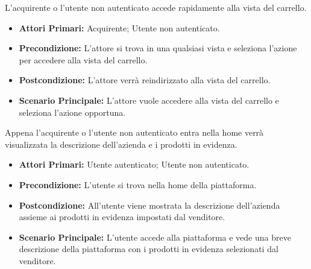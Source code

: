 L'acquirente o l'utente non autenticato accede rapidamente alla vista del carrello.
\begin{itemize}
    \item \textbf{Attori Primari:} Acquirente; Utente non autenticato.
    \item \textbf{Precondizione:} L'attore si trova in una qualsiasi vista e seleziona l'azione per accedere alla vista del carrello.
    \item \textbf{Postcondizione:} L'attore verrà reindirizzato alla vista del carrello.
    \item \textbf{Scenario Principale:} L'attore vuole accedere alla vista del carrello e seleziona l'azione opportuna.
\end{itemize}

Appena l'acquirente o l'utente non autenticato entra nella home verrà visualizzata la descrizione dell'azienda e i prodotti in evidenza.
\begin{itemize}
    \item \textbf{Attori Primari:} Utente autenticato; Utente non autenticato.
    \item \textbf{Precondizione:} L'utente si trova nella home della piattaforma.
    \item \textbf{Postcondizione:} All'utente viene mostrata la descrizione dell'azienda assieme ai prodotti in evidenza impostati dal venditore.
    \item \textbf{Scenario Principale:} L'utente accede alla piattaforma e vede una breve descrizione della piattaforma con i prodotti in evidenza selezionati dal venditore.
\end{itemize}
